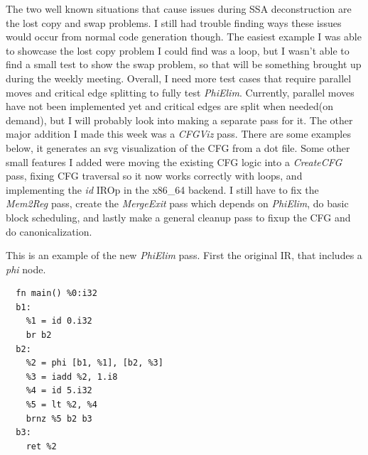 \documentclass[11pt, a4paper, titlepage]{article}
\begin{document}
The two well known situations that cause issues during SSA deconstruction are the lost copy and swap problems.
I still had trouble finding ways these issues would occur from normal code generation though.
The easiest example I was able to showcase the lost copy problem I could find was a loop, but I wasn't able to find a small test to show the swap problem, so that will be something brought up during the weekly meeting.
Overall, I need more test cases that require parallel moves and critical edge splitting to fully test \textit{PhiElim}.
Currently, parallel moves have not been implemented yet and critical edges are split when needed(on demand), but I will probably look into making a separate pass for it.
The other major addition I made this week was a \textit{CFGViz} pass.
There are some examples below, it generates an svg visualization of the CFG from a dot file.
Some other small features I added were moving the existing CFG logic into a \textit{CreateCFG} pass, fixing CFG traversal so it now works correctly with loops, and implementing the \textit{id} IROp in the x86\_64 backend.
I still have to fix the \textit{Mem2Reg} pass, create the \textit{MergeExit} pass which depends on \textit{PhiElim}, do basic block scheduling, and lastly make a general cleanup pass to fixup the CFG and do canonicalization.

This is an example of the new \textit{PhiElim} pass.
First the original IR, that includes a \textit{phi} node.

\begin{lstlisting}
  fn main() %0:i32
  b1:
    %1 = id 0.i32
    br b2
  b2:
    %2 = phi [b1, %1], [b2, %3]
    %3 = iadd %2, 1.i8
    %4 = id 5.i32
    %5 = lt %2, %4
    brnz %5 b2 b3
  b3:
    ret %2
\end{lstlisting}
\end{document}

